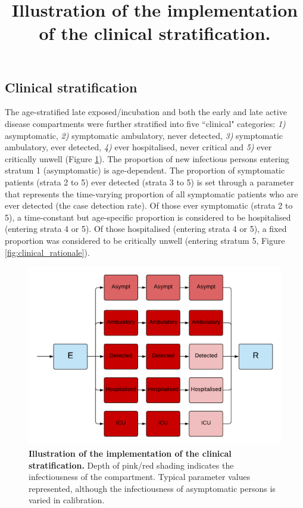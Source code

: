 \subsection{Clinical stratification} \label{clin}
The age-stratified late exposed/incubation and both the early and late active disease compartments were further stratified into five ``clinical" categories: \textit{1)} asymptomatic, \textit{2)} symptomatic ambulatory, never detected, \textit{3)} symptomatic ambulatory, ever detected, \textit{4)} ever hospitalised, never critical and \textit{5)} ever critically unwell (Figure \ref{fig:clinical_strat}).
The proportion of new infectious persons entering stratum 1 (asymptomatic) is age-dependent. The proportion of symptomatic patients (strata 2 to 5) ever detected (strata 3 to 5) is set through a parameter that represents the time-varying proportion of all symptomatic patients who are ever detected (the case detection rate). Of those ever symptomatic (strata 2 to 5), a time-constant but age-specific proportion is considered to be hospitalised (entering strata 4 or 5). Of those hospitalised (entering strata 4 or 5), a fixed proportion was considered to be critically unwell (entering stratum 5, Figure \ref{fig:clinical_rationale}).

\begin{figure}[ht]
    \includegraphics[width=\textwidth]{../covid_19/stratifications/covid_19_clinical_strat.pdf}
    \title{Illustration of the implementation of the clinical stratification.}
    \caption{\textbf{Illustration of the implementation of the clinical stratification.} Depth of pink/red shading indicates the infectiousness of the compartment. Typical parameter values represented, although the infectiousness of asymptomatic persons is varied in calibration.}
    \label{fig:clinical_strat}
\end{figure}


